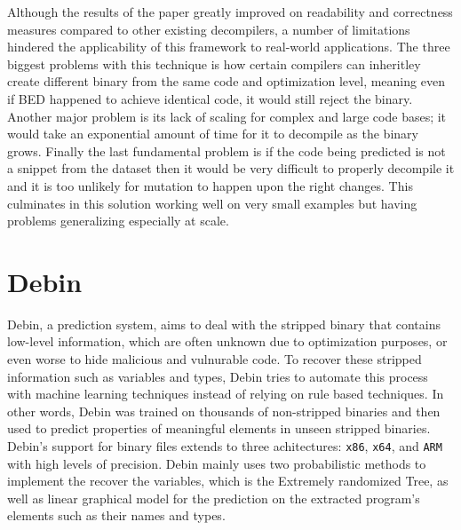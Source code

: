 \documentclass{article}
\begin{document}
Although the results of the paper greatly improved on readability and correctness measures compared to other existing decompilers, a number of limitations hindered the applicability of this framework to real-world applications.
The three biggest problems with this technique is how certain compilers can inheritley create different binary from the same code and optimization level, meaning even if BED happened to achieve identical code, it would still reject the binary.
Another major problem is its lack of scaling for complex and large code bases; it would take an exponential amount of time for it to decompile as the binary grows.
Finally the last fundamental problem is if the code being predicted is not a snippet from the dataset then it would be very difficult to properly decompile it and it is too unlikely for mutation to happen upon the right changes.
This culminates in this solution working well on very small examples but having problems generalizing especially at scale.

\section{Debin}

Debin, a prediction system, aims to deal with the stripped binary that contains low-level information, which are often unknown due to optimization purposes, or even worse to hide malicious and vulnurable code.
To recover these stripped information such as variables and types, Debin tries to automate this process with machine learning techniques instead of relying on rule based techniques. In other words, Debin was trained on thousands of non-stripped binaries and then used to predict properties of meaningful elements in unseen stripped binaries.
Debin's support for binary files extends to three achitectures: \verb|x86|, \verb|x64|, and \verb|ARM| with high levels of precision.
Debin mainly uses two probabilistic methods to implement the recover the variables, which is the Extremely randomized Tree, as well as linear graphical model for the prediction on the extracted program's elements such as their names and types.
\end{document}
